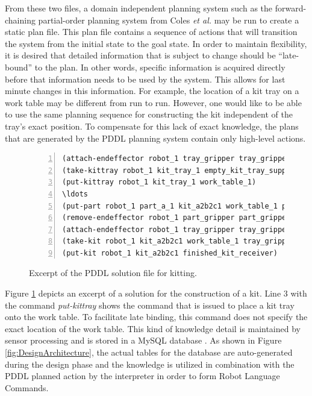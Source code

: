 From these two files, a domain independent planning system such as
the forward-chaining partial-order planning system from Coles \textit{et al.}
\cite{Coles.ICAPS.2010} may be run to create a static plan file. This
plan file contains a sequence of actions that will transition the
system from the initial state to the goal state.
In order to maintain flexibility, it is desired that detailed information
that is subject to change should be ``late-bound'' to the plan.
In other words, specific information is acquired directly before that
information needs to be used by the system.
This allows for last minute changes in this information. For example,
the location of a kit tray on a work table may be different from run to run.
However, one would like to be able to use the same planning sequence for
constructing the kit independent of the tray's exact position.
To compensate for this lack of exact knowledge, the plans that are
generated by the PDDL planning system contain only high-level actions.
\begin{figure}[t!h!]
\begin{minipage}{.5\paperwidth}
\begin{list}{}{\setlength{\leftmargin}{1em}}\item\small
\begin{Verbatim}[commandchars=\\\{\},fontsize=\scriptsize, numbers=left, numbersep=2pt]
(attach-endeffector robot_1 tray_gripper tray_gripper_holder changing_station_1)
(take-kittray robot_1 kit_tray_1 empty_kit_tray_supply tray_gripper work_table_1)
(put-kittray robot_1 kit_tray_1 work_table_1)
\ldots
(put-part robot_1 part_a_1 kit_a2b2c1 work_table_1 part_a_tray)
(remove-endeffector robot_1 part_gripper part_gripper_holder changing_station_1)
(attach-endeffector robot_1 tray_gripper tray_gripper_holder changing_station_1)
(take-kit robot_1 kit_a2b2c1 work_table_1 tray_gripper)
(put-kit robot_1 kit_a2b2c1 finished_kit_receiver)
\end{Verbatim}
\end{list}
\end{minipage}
\caption{Excerpt of the PDDL solution file for kitting.}
\label{fig:Solution}
\end{figure}

Figure \ref{fig:Solution} depicts an excerpt of a solution for
the construction of a kit. Line 3 with the command \textsl{put-kittray}
shows the command that is issued to place
a kit tray onto the work table. To facilitate late binding, this
command does not specify the exact location of the work table.
This kind of knowledge detail is maintained by sensor processing
and is stored in a MySQL database \cite{MySQL}. As shown
in Figure \ref{fig:DesignArchitecture}, the actual tables
for the database are auto-generated during the design phase and the
knowledge is utilized in combination with the PDDL planned action by
the interpreter in order to form Robot Language Commands.


